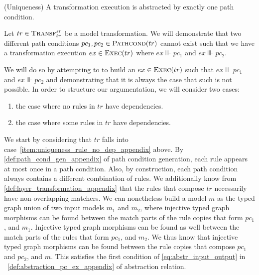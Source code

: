 \begin{lemma} (Uniqueness)
\label{lem:uniqueness_appendix}
A transformation execution is abstracted by exactly one path condition.
\end{lemma}
\begin{pf}
Let $tr\in \textsc{Transf}^{sr}_{tr}$ be a model transformation. We will demonstrate that two different path conditions $pc_1, pc_2\in \textsc{Pathcond}(tr)$ cannot exist such that we have a transformation execution $ex\in \textsc{Exec}(tr)$ where $ex\Vvdash pc_1$ and $ex\Vvdash pc_2$.

We will do so by attempting to to build an $ex\in \textsc{Exec}(tr)$ such that $ex\Vvdash pc_1$ and $ex\Vvdash pc_2$ and demonstrating that it is always the case that such is not possible. In order to structure our argumentation, we will consider two cases:
\begin{enumerate}
  \item\label{item:uniqueness_rule_no_dep_appendix} the case where no rules in $tr$ have dependencies.
  \item\label{item:uniqueness_rule_has_dep_appendix} the case where some rules in $tr$ have dependencies.
\end{enumerate}

We start by considering that $tr$ falls into case~\ref{item:uniqueness_rule_no_dep_appendix} above. By \cref{def:path_cond_gen_appendix} of path condition generation, each rule appears at most once in a path condition. Also, by construction, each path condition always contains a different combination of rules. We additionally know from \cref{def:layer_transformation_appendix} that the rules that compose $tr$ necessarily have non-overlapping matchers. We can nonetheless build a model $m$ as the typed graph union of two input models $m_1$ and $m_2$, where injective typed graph morphisms can be found between the match parts of the rule copies that form $pc_1$, and $m_1$. Injective typed graph morphisms can be found as well between the match parts of the rules that form $pc_1$, and $m_2$. We thus know that injective typed graph morphisms can be found between the rule copies that compose $pc_1$ and $pc_2$, and $m$. This satisfies the first condition of \cref{eq:abstr_input_output} in ~\cref{def:abstraction_pc_ex_appendix} of abstraction relation. 


\end{pf}
